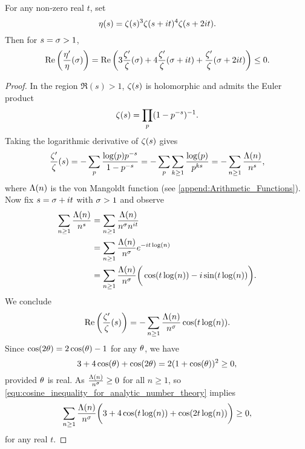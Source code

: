       \begin{lemma}\label{lem:zero-free_region_zeta_lemma}
        For any non-zero real $t$, set
        \[
          \eta(s) = \zeta(s)^{3}\zeta(s+it)^{4}\zeta(s+2it). 
        \]
        Then for $s = \sigma > 1$,
        \[
          \mathrm{Re}\left(\frac{\eta'}{\eta}(\sigma)\right) = \mathrm{Re}\left(3\frac{\zeta'}{\zeta}(\sigma)+4\frac{\zeta'}{\zeta}(\sigma+it)+\frac{\zeta'}{\zeta}(\sigma+2it)\right) \le 0.
        \]
      \end{lemma}
      \begin{proof}
        In the region $\Re(s) > 1$, $\zeta(s)$ is holomorphic and admits the Euler product
        \[
          \zeta(s) = \prod_{p}(1-p^{-s})^{-1}.
        \]
        Taking the logarithmic derivative of $\zeta(s)$ gives
        \begin{equation}\label{equ:Drichlet_series_log_derivative_zeta}
          \frac{\zeta'}{\zeta}(s) = -\sum_{p}\frac{\log(p)p^{-s}}{1-p^{-s}} = -\sum_{p}\sum_{k \ge 1}\frac{\log(p)}{p^{ks}} = -\sum_{n \ge 1}\frac{\Lambda(n)}{n^{s}},
        \end{equation}
        where $\Lambda(n)$ is the von Mangoldt function (see \cref{append:Arithmetic_Functions}). Now fix $s = \sigma+it$ with $\sigma > 1$ and observe
        \begin{align*}
          \sum_{n \ge 1}\frac{\Lambda(n)}{n^{s}} &= \sum_{n \ge 1}\frac{\Lambda(n)}{n^{\sigma}n^{it}} \\
          &= \sum_{n \ge 1}\frac{\Lambda(n)}{n^{\sigma}}e^{-it\log(n)} \\
          &= \sum_{n \ge 1}\frac{\Lambda(n)}{n^{\sigma}}\bigg(\cos(t\log(n))-i\sin(t\log(n))\bigg).
        \end{align*}
        We conclude
        \begin{equation}\label{equ:non-vanishing_of_zeta_on_Re(s)=1_1}
          \mathrm{Re}\left(\frac{\zeta'}{\zeta}(s)\right) = -\sum_{n \ge 1}\frac{\Lambda(n)}{n^{\sigma}}\cos(t\log(n)).
        \end{equation}
        Since $\cos(2\theta) = 2\cos(\theta)-1$ for any $\theta$, we have
        \begin{equation}\label{equ:cosine_inequality_for_analytic_number_theory}
          3+4\cos(\theta)+\cos(2\theta) = 2(1+\cos(\theta))^{2} \ge 0,
        \end{equation}
        provided $\theta$ is real. As $\frac{\Lambda(n)}{n^{\sigma}} \ge 0$ for all $n \ge 1$, so \cref{equ:cosine_inequality_for_analytic_number_theory} implies
        \begin{equation}\label{equ:real_part_eta_zeta_inequality}
          \sum_{n \ge 1}\frac{\Lambda(n)}{n^{\sigma}}\bigg(3+4\cos(t\log(n))+\cos(2t\log(n))\bigg) \ge 0,
        \end{equation}
        for any real $t$.
      \end{proof}

